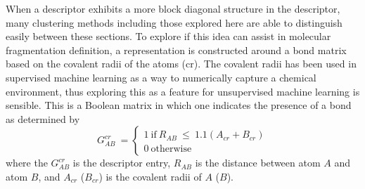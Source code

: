 When a descriptor exhibits a more block diagonal structure in the descriptor, many clustering methods including those explored here are able to distinguish easily between these sections. To explore if this idea can assist in molecular fragmentation definition, a representation is constructed around a bond matrix based on the covalent radii of the atoms (cr).
The covalent radii has been used in supervised machine learning as a way to numerically capture a chemical environment, thus exploring this as a feature for unsupervised machine learning is sensible.\autocite{georgescuDatabaseFeaturesMachine2021,zhaoMachineLearningBasedPrediction2020}
This is a Boolean matrix in which one indicates the presence of a bond as determined by
$$G^{cr}_{AB}\ = \begin{cases} 1\ \text{if}\ R_{AB}\ \leq\ 1.1(A_{cr}+B_{cr})\\
 0\ \text{otherwise} \end{cases}$$
where the $G^{cr}_{AB}$ is the descriptor entry, $R_{AB}$ is the distance between atom $A$ and atom $B$, and $A_{cr}$ ($B_{cr}$) is the covalent radii of $A$ ($B$).\autocite{cordero_covalent_2008,https://doi.org/10.1002/wcms.1491}

